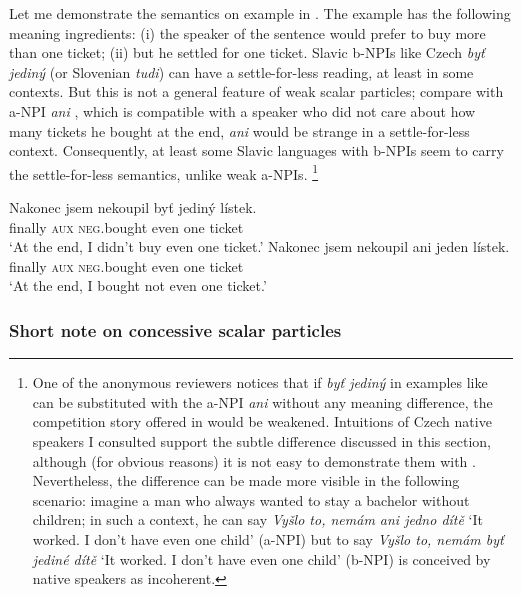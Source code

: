 \documentclass[output=paper,colorlinks,citecolor=brown]{langscibook}
\begin{document}
Let me demonstrate the semantics on example in . The example has the following meaning ingredients: (i) the speaker of the sentence would prefer to buy more than one ticket; (ii) but he settled for one ticket. Slavic b-NPIs like Czech \emph{byť jediný} (or Slovenian \emph{tudi}) can have a settle-for-less reading, at least in some contexts. But this is not a general feature of weak scalar particles; compare  with a-NPI \emph{ani} , which is compatible with a speaker who did not care about how many tickets he bought at the end, \emph{ani} would be strange in a settle-for-less context. Consequently, at least some Slavic languages with b-NPIs seem to carry the settle-for-less semantics, unlike weak a-NPIs.%
\footnote{One of the anonymous reviewers notices that if \textit{byť jediný} in examples like  can be substituted with the a-NPI \textit{ani} without any meaning difference, the competition story offered in  would be weakened. Intuitions of Czech native speakers I consulted support the subtle difference discussed in this section, although (for obvious reasons) it is not easy to demonstrate them with . Nevertheless, the difference can be made more visible in the following scenario: imagine a man who always wanted to stay a bachelor without children; in such a context, he can say \textit{Vyšlo to, nemám ani jedno dítě} `It worked. I don't have even one child' (a-NPI) but to say \textit{Vyšlo to, nemám byť jediné dítě}  `It worked. I don't have even one child' (b-NPI) is conceived by native speakers as incoherent.}

\ea\ea\label{ex:58} \gll Nakonec jsem nekoupil byť jediný lístek.\\
finally \textsc{aux} \textsc{neg}.bought even one ticket\\
\glt `At the end, I didn't buy even one ticket.'
\ex\label{ex:59} \gll Nakonec jsem nekoupil ani jeden lístek.\\
finally \textsc{aux} \textsc{neg}.bought even one ticket\\
\glt `At the end, I bought not even one ticket.'
\z\z

\subsubsection{Short note on concessive scalar particles}\label{short-note-on-concessive-scalar-particles}
\end{document}
